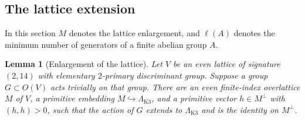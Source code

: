 \documentclass[11pt]{amsart}
\newtheorem{lemma}[theorem]{Lemma}
\theoremstyle{definition}
\theoremstyle{remark}
\numberwithin{equation}{section}
\begin{document}
\subsection{The lattice extension}

In this section \(M\) denotes the lattice enlargement, and
\(\ell(A)\) denotes the minimum number of generators of a finite abelian
group \(A\).

\begin{lemma}[Enlargement of the lattice]
\label{pencil:lattice}
Let \(V\) be an even lattice of signature \((2,14)\) with elementary
\(2\)-primary discriminant group.  Suppose a group \(G\subset O(V)\) acts
trivially on that group.  There are an even finite-index overlattice \(M\)
of \(V\), a primitive embedding \(M\hookrightarrow\Lambda_{\mathrm{K3}}\), and a
primitive vector \(h\in M^\perp\) with \((h,h)>0\), such that the action of
\(G\) extends to \(\Lambda_{\mathrm{K3}}\) and is the identity on \(M^\perp\).
\end{lemma}
\end{document}
